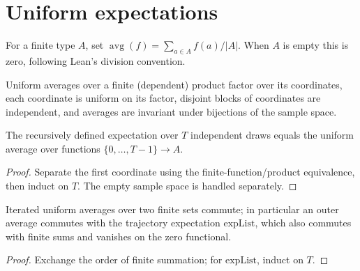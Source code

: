 \begin{abstract}
A shared library for finite stochastic dynamics using normalized real weights,
finite sums, and limits of finite-time probabilities. These are generic library
results, rather than statements attributed to a particular opinion-dynamics paper.
\end{abstract}

\section{Uniform expectations}
\begin{definition}\label{def:avg}
\leanok
For a finite type $A$, set $\operatorname{avg}(f)=\sum_{a\in A}f(a)/|A|$.
When $A$ is empty this is zero, following Lean's division convention.
\end{definition}
\begin{lemma}\label{lem:uniform-product}
\leanok{}
Uniform averages over a finite (dependent) product factor over its coordinates, each
coordinate is uniform on its factor, disjoint blocks of coordinates are independent,
and averages are invariant under bijections of the sample space.
\end{lemma}
\begin{lemma}\label{lem:uniform-trajectory}
\leanok{}
The recursively defined expectation over $T$ independent draws equals the
uniform average over functions $\{0,\ldots,T-1\}\to A$.
\end{lemma}
\begin{proof}\leanok
Separate the first coordinate using the finite-function/product equivalence,
then induct on $T$. The empty sample space is handled separately.
\end{proof}
\begin{lemma}\label{lem:avg-commute}
\leanok{}
Iterated uniform averages over two finite sets commute; in particular an outer
average commutes with the trajectory expectation $\mathrm{expList}$, which also
commutes with finite sums and vanishes on the zero functional.
\end{lemma}
\begin{proof}\leanok
Exchange the order of finite summation; for $\mathrm{expList}$, induct on $T$.
\end{proof}

